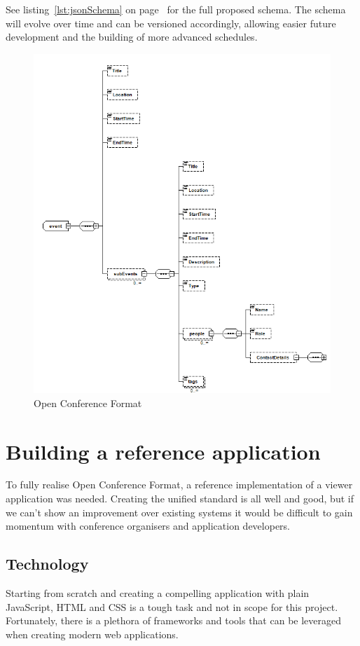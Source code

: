 \documentclass[conference]{IEEEtran}
\begin{document}
See listing~\ref{lst:jsonSchema} on page~\pageref{lst:jsonSchema} for the full proposed schema. The schema will evolve over time and can be versioned accordingly, allowing easier future development and the building of more advanced schedules.

\begin{figure}[h]
  \centering
  \includegraphics[scale=0.475]{images/schema_1.png}
  \caption{Open Conference Format}
  \label{fig:schema_1}
\end{figure}

\section{Building a reference application}

To fully realise Open Conference Format, a reference implementation of a viewer application was needed. Creating the unified standard is all well and good, but if we can't show an improvement over existing systems it would be difficult to gain momentum with conference organisers and application developers.

\subsection{Technology}
Starting from scratch and creating a compelling application with plain JavaScript, HTML and CSS is a tough task and not in scope for this project. Fortunately, there is a plethora of frameworks and tools that can be leveraged when creating modern web applications.
\end{document}
